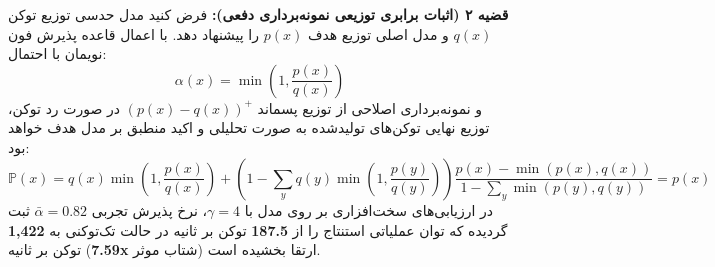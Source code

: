 \noindent\textbf{قضیه ۲ (اثبات برابری توزیعی نمونه‌برداری دفعی):}
فرض کنید مدل حدسی توزیع توکن $q(x)$ و مدل اصلی توزیع هدف $p(x)$ را پیشنهاد دهد. با اعمال قاعده پذیرش فون نویمان با احتمال:
\begin{equation}
\alpha(x) = \min\left(1, \frac{p(x)}{q(x)}\right)
\end{equation}
و نمونه‌برداری اصلاحی از توزیع پسماند $(p(x) - q(x))^+$ در صورت رد توکن، توزیع نهایی توکن‌های تولیدشده به صورت تحلیلی و اکید منطبق بر مدل هدف خواهد بود:
\begin{equation}
\mathbb{P}(x) = q(x) \min\left(1, \frac{p(x)}{q(x)}\right) + \left(1 - \sum_y q(y) \min\left(1, \frac{p(y)}{q(y)}\right)\right) \frac{p(x) - \min(p(x), q(x))}{1 - \sum_y \min(p(y), q(y))} = p(x)
\end{equation}
در ارزیابی‌های سخت‌افزاری بر روی مدل  با $\gamma = 4$، نرخ پذیرش تجربی $\bar{\alpha} = 0.82$ ثبت گردیده که توان عملیاتی استنتاج را از \textbf{187.5} توکن بر ثانیه در حالت تک‌توکنی به \textbf{1,422} توکن بر ثانیه (\textbf{7.59x} شتاب موثر) ارتقا بخشیده است.
